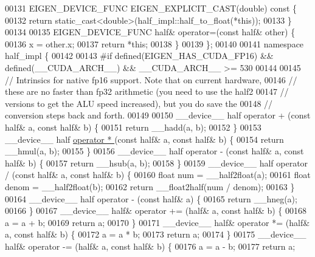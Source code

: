 \begin{DoxyCode}
00131   EIGEN\_DEVICE\_FUNC EIGEN\_EXPLICIT\_CAST(\textcolor{keywordtype}{double})\textcolor{keyword}{ const }\{
00132     \textcolor{keywordflow}{return} \textcolor{keyword}{static\_cast<}\textcolor{keywordtype}{double}\textcolor{keyword}{>}(half\_impl::half\_to\_float(*\textcolor{keyword}{this}));
00133   \}
00134 
00135   EIGEN\_DEVICE\_FUNC half& operator=(\textcolor{keyword}{const} half& other) \{
00136     x = other.x;
00137     \textcolor{keywordflow}{return} *\textcolor{keyword}{this};
00138   \}
00139 \};
00140 
00141 \textcolor{keyword}{namespace }half\_impl \{
00142 
00143 \textcolor{preprocessor}{#if defined(EIGEN\_HAS\_CUDA\_FP16) && defined(\_\_CUDA\_ARCH\_\_) && \_\_CUDA\_ARCH\_\_ >= 530}
00144 
00145 \textcolor{comment}{// Intrinsics for native fp16 support. Note that on current hardware,}
00146 \textcolor{comment}{// these are no faster than fp32 arithmetic (you need to use the half2}
00147 \textcolor{comment}{// versions to get the ALU speed increased), but you do save the}
00148 \textcolor{comment}{// conversion steps back and forth.}
00149 
00150 \_\_device\_\_ half operator + (\textcolor{keyword}{const} half& a, \textcolor{keyword}{const} half& b) \{
00151   \textcolor{keywordflow}{return} \_\_hadd(a, b);
00152 \}
00153 \_\_device\_\_ half \hyperlink{namespace_eigen_a32970f7eb62fe31eeefee72d24a046d0}{operator * }(\textcolor{keyword}{const} half& a, \textcolor{keyword}{const} half& b) \{
00154   \textcolor{keywordflow}{return} \_\_hmul(a, b);
00155 \}
00156 \_\_device\_\_ half operator - (\textcolor{keyword}{const} half& a, \textcolor{keyword}{const} half& b) \{
00157   \textcolor{keywordflow}{return} \_\_hsub(a, b);
00158 \}
00159 \_\_device\_\_ half operator / (\textcolor{keyword}{const} half& a, \textcolor{keyword}{const} half& b) \{
00160   \textcolor{keywordtype}{float} num = \_\_half2float(a);
00161   \textcolor{keywordtype}{float} denom = \_\_half2float(b);
00162   \textcolor{keywordflow}{return} \_\_float2half(num / denom);
00163 \}
00164 \_\_device\_\_ half operator - (\textcolor{keyword}{const} half& a) \{
00165   \textcolor{keywordflow}{return} \_\_hneg(a);
00166 \}
00167 \_\_device\_\_ half& operator += (half& a, \textcolor{keyword}{const} half& b) \{
00168   a = a + b;
00169   \textcolor{keywordflow}{return} a;
00170 \}
00171 \_\_device\_\_ half& operator *= (half& a, \textcolor{keyword}{const} half& b) \{
00172   a = a * b;
00173   \textcolor{keywordflow}{return} a;
00174 \}
00175 \_\_device\_\_ half& operator -= (half& a, \textcolor{keyword}{const} half& b) \{
00176   a = a - b;
00177   \textcolor{keywordflow}{return} a;

\end{DoxyCode}

